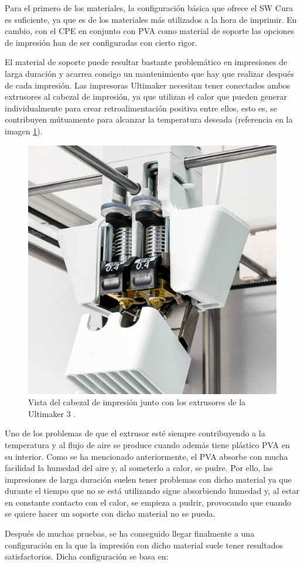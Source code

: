 Para el primero de los materiales, la configuración básica que ofrece el \ac{SW}
Cura es suficiente, ya que es de los materiales más utilizados a la hora de imprimir.
En cambio, con el \ac{CPE} en conjunto con \ac{PVA} como material de soporte las
opciones de impresión han de ser configuradas con cierto rigor.

El material de soporte puede resultar bastante problemático en impresiones de larga
duración y acarrea consigo un mantenimiento que hay que realizar después de cada
impresión. Las impresoras Ultimaker necesitan tener conectados ambos extrusores
al cabezal de impresión, ya que utilizan el calor que pueden generar individualmente
para crear retroalimentación positiva entre ellos, esto es, se contribuyen mútuamente
para alcanzar la temperatura deseada (referencia en la imagen \ref{fig:um3_extruders}).

\begin{figure}[H]
    \centering
    \includegraphics[width=.5\linewidth]{pictures/um3_extruders.png}
    \caption{Vista del cabezal de impresión junto con los extrusores de la Ultimaker 3 \cite{3duniverseUltimaker}.}
    \label{fig:um3_extruders}
\end{figure}

Uno de los problemas de que el extrusor esté siempre contribuyendo a la temperatura
y al flujo de aire se produce cuando además tiene plástico \ac{PVA} en su interior.
Como se ha mencionado anteriormente, el \ac{PVA} absorbe con mucha facilidad la humedad
del aire y, al someterlo a calor, se pudre. Por ello, las impresiones de larga duración
suelen tener problemas con dicho material ya que durante el tiempo que no se está
utilizando sigue absorbiendo humedad y, al estar en constante contacto con el calor,
se empieza a pudrir, provocando que cuando se quiere hacer un soporte con dicho material
no se pueda.

Después de muchas pruebas, se ha conseguido llegar finalmente a una configuración en
la que la impresión con dicho material suele tener resultados satisfactorios. Dicha
configuración se basa en:

